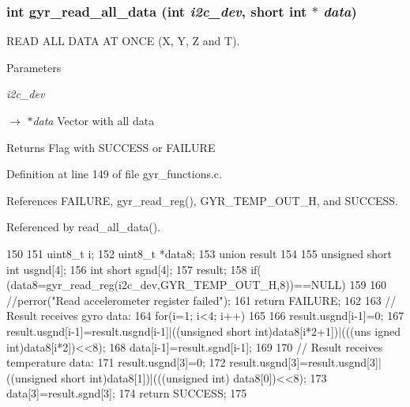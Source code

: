 \hypertarget{group__gyr_ga79875465c3a29fd9ec77308c80a8bc37}{
\subsubsection[{gyr\_\-read\_\-all\_\-data}]{\setlength{\rightskip}{0pt plus 5cm}int gyr\_\-read\_\-all\_\-data (int {\em i2c\_\-dev}, \/  short int $\ast$ {\em data})}}
\label{group__gyr_ga79875465c3a29fd9ec77308c80a8bc37}


READ ALL DATA AT ONCE (X, Y, Z and T). 


\begin{DoxyParams}{Parameters}
\item[{\em i2c\_\-dev}]\item[\mbox{$\rightarrow$} {\em $\ast$data}]Vector with all data \end{DoxyParams}
\begin{DoxyReturn}{Returns}
Flag with SUCCESS or FAILURE 
\end{DoxyReturn}


Definition at line 149 of file gyr\_\-functions.c.



References FAILURE, gyr\_\-read\_\-reg(), GYR\_\-TEMP\_\-OUT\_\-H, and SUCCESS.



Referenced by read\_\-all\_\-data().




\begin{DoxyCode}
150 {
151   uint8_t i;
152   uint8_t *data8;
153   union result
154   {
155     unsigned short int usgnd[4];
156     int short sgnd[4];
157   } result;
158   if( (data8=gyr_read_reg(i2c_dev,GYR_TEMP_OUT_H,8))==NULL)
159   {
160     //perror("Read accelerometer register failed");
161     return FAILURE;
162   }
163   // Result receives gyro data:
164   for(i=1; i<4; i++)
165   {
166     result.usgnd[i-1]=0;
167     result.usgnd[i-1]=result.usgnd[i-1]|((unsigned short int)data8[i*2+1])|(((uns
      igned int)data8[i*2])<<8);
168     data[i-1]=result.sgnd[i-1];
169   }
170   // Result receives temperature data:
171   result.usgnd[3]=0;
172   result.usgnd[3]=result.usgnd[3]|((unsigned short int)data8[1])|(((unsigned int)
      data8[0])<<8);  
173   data[3]=result.sgnd[3];
174   return SUCCESS;  
175 }
\end{DoxyCode}




